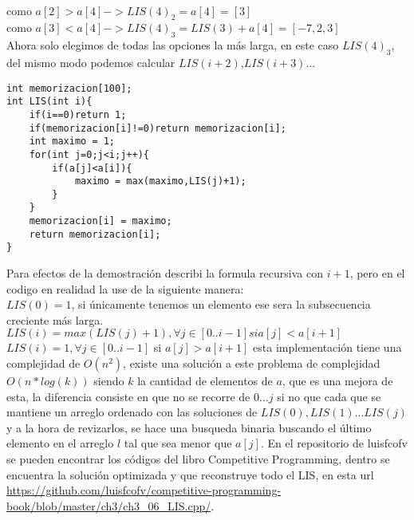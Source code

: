 \\como $a[2] > a[4] -> LIS(4)_2 = a[4] = [3]$
\\como $a[3] < a[4] -> LIS(4)_3 = LIS(3) + a[4] = [-7,2,3]$
\\Ahora solo elegimos de todas las opciones la más larga, en este caso $LIS(4)_3$, del mismo modo podemos calcular $LIS(i+2)$,$LIS(i+3)$... 
\\\begin{minipage}{\textwidth}
\begin{lstlisting}[style=C,caption=LIS.cpp]
int memorizacion[100];
int LIS(int i){
    if(i==0)return 1;
    if(memorizacion[i]!=0)return memorizacion[i];
    int maximo = 1;
    for(int j=0;j<i;j++){
        if(a[j]<a[i]){
            maximo = max(maximo,LIS(j)+1);
        }
    }
    memorizacion[i] = maximo;
    return memorizacion[i];
}
\end{lstlisting}
\end{minipage}
Para efectos de la demostración describi la formula recursiva con $i+1$, pero en el codigo en realidad la use de la siguiente manera:
\\$LIS(0) = 1$, si únicamente tenemos un elemento ese sera la subsecuencia creciente más larga.
\\$LIS(i) = max(LIS(j)+1), \forall j \in [0..i-1] si a[j]<a[i+1]$
\\$LIS(i) = 1, \forall j \in [0..i-1]$ si $a[j]>a[i+1]$
esta implementación tiene una complejidad de $O(n^2)$, existe una solución a este problema de complejidad $O(n*log(k))$ siendo $k$ la cantidad de elementos de $a$, que es una mejora de esta, la diferencia consiste en que no se recorre de $0...j$ si no que cada que se mantiene un arreglo ordenado con las soluciones de $LIS(0),LIS(1)...LIS(j)$ y a la hora de revizarlos, se hace una busqueda binaria buscando el último elemento en el arreglo $l$ tal que sea menor que $a[j]$. En el repositorio de luisfcofv se pueden encontrar los códigos del libro Competitive Programming, dentro se encuentra la solución optimizada y que reconstruye todo el LIS, en esta url \url{https://github.com/luisfcofv/competitive-programming-book/blob/master/ch3/ch3_06_LIS.cpp/}.